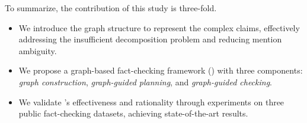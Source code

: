 To summarize, the contribution of this study is three-fold.
\begin{itemize}
    \item We introduce the graph structure to represent the complex claims, effectively addressing the insufficient decomposition problem and reducing mention ambiguity.
    \item We propose a graph-based fact-checking framework ({\MyFC}) with three components: \textit{graph construction}, \textit{graph-guided planning}, and \textit{graph-guided checking}.
    \item We validate {\MyFC}'s effectiveness and rationality through experiments on three public fact-checking datasets, achieving state-of-the-art results. 
\end{itemize}





